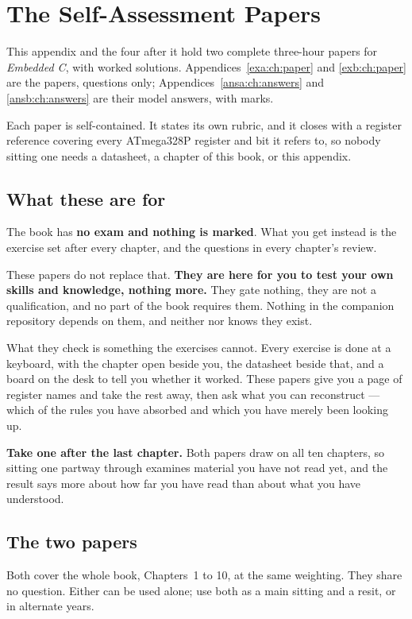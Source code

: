 
\chapter{The Self-Assessment Papers}
\label{exam:ch:about}

This appendix and the four after it hold two complete three-hour papers for \emph{Embedded C},
with worked solutions. Appendices~\ref{exa:ch:paper} and \ref{exb:ch:paper} are the papers,
questions only; Appendices~\ref{ansa:ch:answers} and \ref{ansb:ch:answers} are their model answers,
with marks.

Each paper is self-contained. It states its own rubric, and it closes with a register reference
covering every ATmega328P register and bit it refers to, so nobody sitting one needs a datasheet,
a chapter of this book, or this appendix.

\section*{What these are for}
The book has \textbf{no exam and nothing is marked}. What you get instead is the exercise set after
every chapter, and the questions in every chapter's review.

These papers do not replace that. \textbf{They are here for you to test your own skills and
knowledge, nothing more.} They gate nothing, they are not a qualification, and no part of the book
requires them. Nothing in the companion repository depends on them, and neither 
nor  knows they exist.

What they check is something the exercises cannot. Every exercise is done at a keyboard, with the
chapter open beside you, the datasheet beside that, and a board on the desk to tell you whether it
worked. These papers give you a page of register names and take the rest away, then ask what you
can reconstruct --- which of the rules you have absorbed and which you have merely been looking up.

\textbf{Take one after the last chapter.} Both papers draw on all ten chapters, so sitting one
partway through examines material you have not read yet, and the result says more about how far
you have read than about what you have understood.

\section*{The two papers}
Both cover the whole book, Chapters~1 to 10, at the same weighting. They share no question. Either
can be used alone; use both as a main sitting and a resit, or in alternate years.

